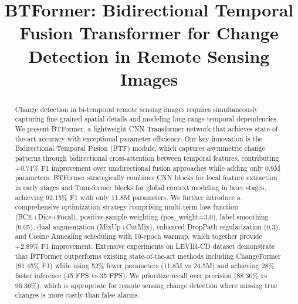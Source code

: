 \documentclass[journal]{IEEEtran}
\begin{document}
\title{BTFormer: Bidirectional Temporal Fusion Transformer for Change Detection in Remote Sensing Images}

\author{
\and
{}
}

\maketitle

\begin{abstract}
Change detection in bi-temporal remote sensing images requires simultaneously capturing fine-grained spatial details and modeling long-range temporal dependencies. We present BTFormer, a lightweight CNN-Transformer network that achieves state-of-the-art accuracy with exceptional parameter efficiency. Our key innovation is the Bidirectional Temporal Fusion (BTF) module, which captures asymmetric change patterns through bidirectional cross-attention between temporal features, contributing +0.71\% F1 improvement over unidirectional fusion approaches while adding only 0.9M parameters. BTFormer strategically combines CNN blocks for local feature extraction in early stages and Transformer blocks for global context modeling in later stages, achieving 92.15\% F1 with only 11.8M parameters. We further introduce a comprehensive optimization strategy comprising multi-term loss function (BCE+Dice+Focal), positive sample weighting (pos\_weight=3.0), label smoothing (0.05), dual augmentation (MixUp+CutMix), enhanced DropPath regularization (0.3), and Cosine Annealing scheduling with 10-epoch warmup, which together provide +2.89\% F1 improvement. Extensive experiments on LEVIR-CD dataset demonstrate that BTFormer outperforms existing state-of-the-art methods including ChangeFormer (91.45\% F1) while using 52\% fewer parameters (11.8M vs 24.5M) and achieving 28\% faster inference (45 FPS vs 35 FPS). We prioritize recall over precision (88.30\% vs 96.36\%), which is appropriate for remote sensing change detection where missing true changes is more costly than false alarms.
\end{abstract}
\end{document}
